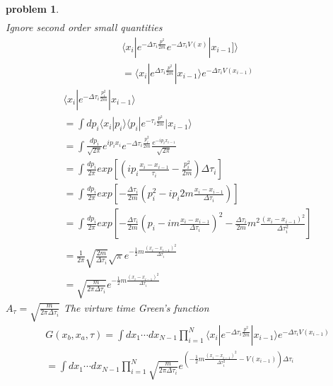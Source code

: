 \documentclass[a4paper,11pt]{article}
\newtheorem{problem}{problem}[subsection]
\begin{document}
\begin{problem}
\begin{equation*}
\begin{split}
    \end{split}
  \end{equation*}
  Ignore second order small quantities
  \begin{equation*}
    \begin{split}
       &\langle x_i|e^{-\Delta\tau_i\frac{p^2}{2m}}e^{-\Delta\tau_iV(x)}|x_{i-1}]\rangle\\
         &=\langle x_i|e^{\Delta\tau_i\frac{p^2}{2m}}|x_{i-1}\rangle e^{-\Delta \tau_iV(x_{i-1})}
    \end{split}
  \end{equation*}
  \begin{equation*}
    \begin{split}
       &\langle x_i|e^{-\Delta\tau_i\frac{p_{i}^2}{2m}}|x_{i-1}\rangle\\
         &=\int dp_i\langle x_i|p_i\rangle\langle p_i|e^{-\tau_i\frac{p^2}{2m}}|x_{i-1}\rangle\\
         &=\int \frac{dp_i}{\sqrt{2\pi}}e^{ip_ix_i}e^{-\Delta\tau_i\frac{p_i^2}{2m}}\frac{e^{-ip_ix_{i-1}}}{\sqrt{2\pi}}\\
         &=\int\frac{dp_i}{2\pi}exp\left[(ip_i\frac{x_i-x_{i-1}}{\tau_i}-\frac{p_i^2}{2m})\Delta\tau_i\right]\\
         &=\int\frac{dp_i}{2\pi}exp\left[-\frac{\Delta\tau_i}{2m}(p_i^2-ip_i2m\frac{x_i-x_{i-1}}{\Delta\tau_i})\right]\\
         &=\int\frac{dp_i}{2\pi}exp\left[-\frac{\Delta\tau_i}{2m}(p_i-im\frac{x_i-x_{i-1}}{\Delta\tau_i})^2-\frac{\Delta\tau_i}{2m}m^2\frac{(x_i-x_{i-1})^2}{\Delta\tau_i^2}\right]\\
         &=\frac{1}{2\pi}\sqrt{\frac{2m}{\Delta\tau_i}}\sqrt{\pi}e^{-\frac{1}{2}m\frac{(x_i-x_{i-1})^2}{\Delta\tau_i}}\\
         &=\sqrt{\frac{m}{2\pi\Delta\tau_i}}e^{-\frac{1}{2}m\frac{(x_i-x_{i-1})^2}{\Delta\tau_i}}
    \end{split}
  \end{equation*}
  $A_\tau=\sqrt{\frac{m}{2\pi\Delta\tau_i}}$
  The virture time Green's function
  \begin{equation*}
    \begin{split}
       &G(x_b,x_a,\tau)=\int dx_1\cdots dx_{N-1}\prod_{i=1}^{N}\langle x_i|e^{-\Delta\tau_i\frac{p^2}{2m}}|x_{i-1}\rangle e^{-\Delta\tau_iV(x_{i-1})}\\
         &=\int dx_1\cdots dx_{N-1}\prod_{i=1}^{N}\sqrt{\frac{m}{2\pi\Delta\tau_i}}e^{(-\frac{1}{2}m\frac{(x_i-x_{i-1})^2}{\Delta\tau_i^2}-V(x_{i-1}))\Delta\tau_i}\\

\end{split}
\end{equation*}
\end{problem}
\end{document}
